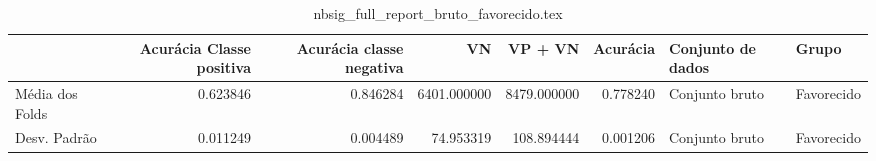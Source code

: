 \begin{table}
\centering
\caption{nbsig_full_report_bruto_favorecido.tex}
\label{nbsig_full_report_bruto_favorecido.tex}
\begin{tabular}{lrrrrrll}
\toprule
{}              &  Acurácia Classe positiva &  Acurácia classe negativa &          VN  &     VP + VN  &  Acurácia & Conjunto de dados &       Grupo \\
\midrule
Média dos Folds &                  0.623846 &                  0.846284 &  6401.000000 &  8479.000000 &  0.778240 &    Conjunto bruto &  Favorecido \\
Desv. Padrão    &                  0.011249 &                  0.004489 &    74.953319 &   108.894444 &  0.001206 &    Conjunto bruto &  Favorecido \\
\bottomrule
\end{tabular}
\end{table}
